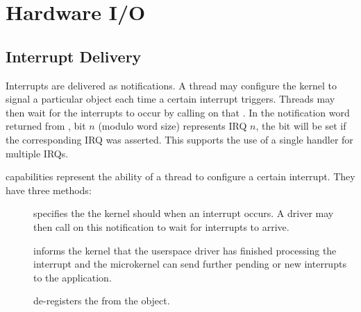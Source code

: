 %
%
%
%

\chapter{\label{ch:io}Hardware I/O}

\section{Interrupt Delivery}
\label{sec:interrupts}

\BEGCHECK
Interrupts are delivered as notifications. A thread
may configure the kernel to signal a particular 
object each time a certain interrupt triggers. Threads may then wait for
the interrupts to occur by calling  on
that . In the  notification word returned from
,  bit $n$  (modulo
word size) represents IRQ $n$, the bit will be set if the
corresponding IRQ was asserted. This supports the use of a single handler for
multiple IRQs.

 capabilities represent the ability of a thread to
configure a certain interrupt. They have three methods:

\begin{description}

    \item[]
    specifies the  the kernel should
     when an interrupt occurs. A driver
    may then call  on this notification to
    wait for interrupts to arrive.

    \item[]
    informs the kernel that the userspace driver has finished processing
    the interrupt and the microkernel can send further pending or new
    interrupts to the application.

    \item[]
    de-registers the  from the  object.
\end{description}
\ENDCHECK

